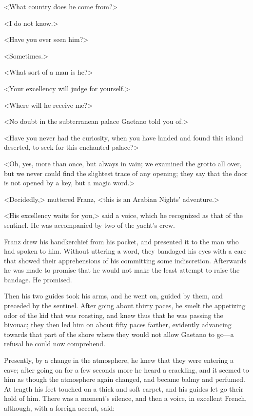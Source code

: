 <What country does he come from?> 

 <I do not know.> 

 <Have you ever seen him?> 

 <Sometimes.> 

 <What sort of a man is he?> 

 <Your excellency will judge for yourself.> 

 <Where will he receive me?> 

 <No doubt in the subterranean palace Gaetano told you of.> 

 <Have you never had the curiosity, when you have landed and found this island deserted, to seek for this enchanted palace?> 

 <Oh, yes, more than once, but always in vain; we examined the grotto all over, but we never could find the slightest trace of any opening; they say that the door is not opened by a key, but a magic word.> 

 <Decidedly,> muttered Franz, <this is an Arabian Nights' adventure.> 

 <His excellency waits for you,> said a voice, which he recognized as that of the sentinel. He was accompanied by two of the yacht's crew. 

 Franz drew his handkerchief from his pocket, and presented it to the man who had spoken to him. Without uttering a word, they bandaged his eyes with a care that showed their apprehensions of his committing some indiscretion. Afterwards he was made to promise that he would not make the least attempt to raise the bandage. He promised. 

 Then his two guides took his arms, and he went on, guided by them, and preceded by the sentinel. After going about thirty paces, he smelt the appetizing odor of the kid that was roasting, and knew thus that he was passing the bivouac; they then led him on about fifty paces farther, evidently advancing towards that part of the shore where they would not allow Gaetano to go—a refusal he could now comprehend. 

 Presently, by a change in the atmosphere, he knew that they were entering a cave; after going on for a few seconds more he heard a crackling, and it seemed to him as though the atmosphere again changed, and became balmy and perfumed. At length his feet touched on a thick and soft carpet, and his guides let go their hold of him. There was a moment's silence, and then a voice, in excellent French, although, with a foreign accent, said: 

